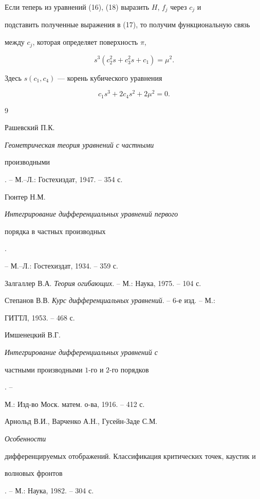 Если теперь из уравнений (16), (18) выразить $H$, $f_j$ через $c_j$ и


подставить полученные выражения в (17), то получим функциональную связь


между $c_j$, которая определяет поверхность $\pi$,


$$


s^3(c^2_2s+c^2_3s+c_1)=\mu^2.


$$


Здесь $s(c_1,c_4)$ --- корень кубического уравнения


$$


c_1s^3+2c_4s^2+2\mu^2=0.


$$





\begin{thebibliography}{9}







Рашевский П.К. {\em Геометрическая теория уравнений с частными


производными}. -- М.--Л.: Гостехиздат, 1947. -- 354 с.




Гюнтер Н.М. {\em Интегрирование дифференциальных уравнений первого


порядка в частных производных}.


-- М.--Л.: Гостехиздат, 1934. -- 359 с.




Залгаллер В.А. {\em Теория огибающих}. -- М.: Наука, 1975. -- 104 с.




Степанов В.В. {\em Курс дифференциальных уравнений}. -- 6-е изд. -- М.:


ГИТТЛ, 1953. -- 468 с.




Имшенецкий В.Г. {\em Интегрирование дифференциальных уравнений с


частными производными $1$-го и $2$-го порядков}. --


М.: Изд-во Моск. матем. о-ва, 1916. -- 412 с.




Арнольд В.И., Варченко А.Н., Гусейн-Заде С.М. {\em Особенности


дифференцируемых отображений. Классификация критических точек, каустик и


волновых фронтов}. -- М.: Наука, 1982. -- 304 с.





\end{thebibliography}





\vskip 0.2cm












\label{end}





